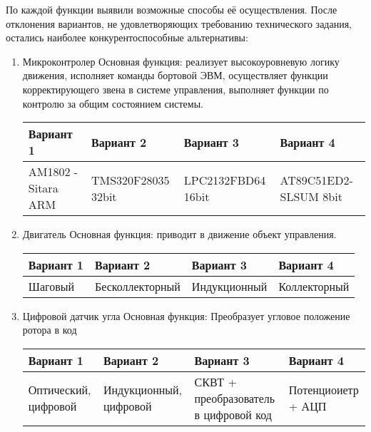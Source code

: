 По каждой функции выявили возможные способы её осуществления.
После отклонения вариантов, не удовлетворяющих требованию технического
задания, остались наиболее конкурентоспособные альтернативы:

\begin{enumerate}
    \item Микроконтролер
        Основная функция: реализует высокоуровневую логику движения,
        исполняет команды бортовой ЭВМ, осуществляет функции корректирующего
        звена в системе управления, выполняет функции по контролю за общим
        состоянием системы.

        \begin{tabular}{|p{3.5cm}|p{3.5cm}|p{3.5cm}|p{3.5cm}|}
            \hline
            Вариант 1 & Вариант 2 & Вариант 3 & Вариант 4 \\
            \hline
            AM1802 - Sitara ARM &
            TMS320F28035 32bit&
            LPC2132FBD64 16bit&
            AT89C51ED2-SLSUM 8bit\\
            \hline
        \end{tabular}

    \item Двигатель
        Основная функция: приводит в движение объект управления.

        \begin{tabular}{|p{3.5cm}|p{3.5cm}|p{3.5cm}|p{3.5cm}|}
            \hline
            Вариант 1 & Вариант 2 & Вариант 3 & Вариант 4 \\
            \hline
            Шаговый &
            Бесколлекторный &
            Индукционный &
            Коллекторный \\
            \hline
        \end{tabular}

    \item Цифровой датчик угла
        Основная функция: Преобразует угловое положение ротора в код

        \begin{tabular}{|p{3.5cm}|p{3.5cm}|p{3.5cm}|p{3.5cm}|}
            \hline
            Вариант 1 & Вариант 2 & Вариант 3 & Вариант 4 \\
            \hline
            Оптический, цифровой &
            Индукционный, цифровой &
            СКВТ + преобразователь в цифровой код &
            Потенциоиетр + АЦП \\
            \hline
        \end{tabular}


\end{enumerate}
